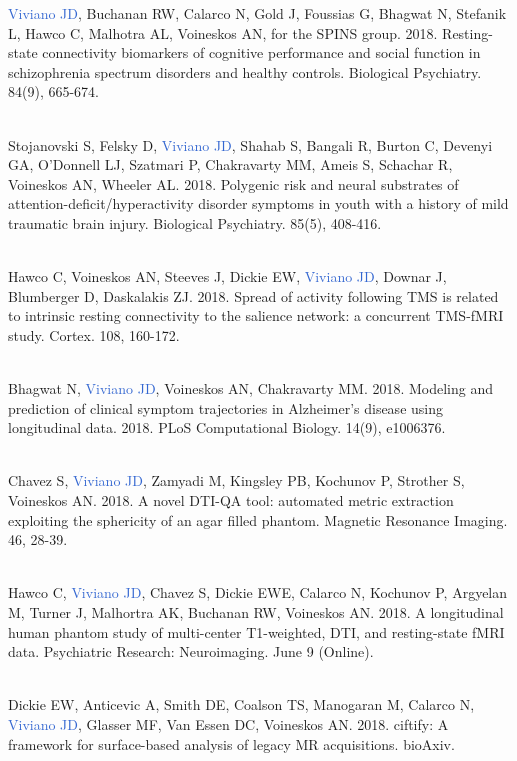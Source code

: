 \documentclass[a4paper,11pt,oneside]{book}
\begin{document}
\begin{flushleft}
\textcolor{highlight}{Viviano JD}, Buchanan RW, Calarco N, Gold J, Foussias G, Bhagwat N, Stefanik L, Hawco C, Malhotra AL, Voineskos AN, for the SPINS group. 2018. Resting-state connectivity biomarkers of cognitive performance and social function in schizophrenia spectrum disorders and healthy controls. Biological Psychiatry. 84(9), 665-674.  \\\

Stojanovski S, Felsky D, \textcolor{highlight}{Viviano JD}, Shahab S, Bangali R, Burton C, Devenyi GA, O'Donnell LJ, Szatmari P, Chakravarty MM, Ameis S, Schachar R, Voineskos AN, Wheeler AL. 2018. Polygenic risk and neural substrates of attention-deficit/hyperactivity disorder symptoms in youth with a history of mild traumatic brain injury. Biological Psychiatry. 85(5), 408-416. \\\

Hawco C, Voineskos AN,  Steeves J, Dickie EW, \textcolor{highlight}{Viviano JD}, Downar J, Blumberger D, Daskalakis ZJ. 2018. Spread of activity following TMS is related to intrinsic resting connectivity to the salience network: a concurrent TMS-fMRI study. Cortex. 108, 160-172. \\\

Bhagwat N, \textcolor{highlight}{Viviano JD}, Voineskos AN, Chakravarty MM. 2018. Modeling and prediction of clinical symptom trajectories in Alzheimer's disease using longitudinal data. 2018. PLoS Computational Biology. 14(9), e1006376. \\\

Chavez S, \textcolor{highlight}{Viviano JD}, Zamyadi M, Kingsley PB, Kochunov P, Strother S, Voineskos AN. 2018. A novel DTI-QA tool: automated metric extraction exploiting the sphericity of an agar filled phantom. Magnetic Resonance Imaging. 46, 28-39. \\\

Hawco C, \textcolor{highlight}{Viviano JD}, Chavez S, Dickie EWE, Calarco N, Kochunov P, Argyelan M, Turner J, Malhortra AK, Buchanan RW, Voineskos AN. 2018. A longitudinal human phantom study of multi-center T1-weighted, DTI, and resting-state fMRI data. Psychiatric Research: Neuroimaging. June 9 (Online).  \\\

Dickie EW, Anticevic A, Smith DE, Coalson TS, Manogaran M, Calarco N, \textcolor{highlight}{Viviano JD}, Glasser MF, Van Essen DC, Voineskos AN. 2018. ciftify: A framework for surface-based analysis of legacy MR acquisitions. bioAxiv. \\\


\end{flushleft}
\end{document}
